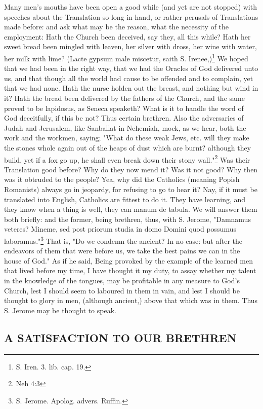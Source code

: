 Many men's mouths have been open a good while (and yet are not stopped) with speeches about the Translation so long in hand, or rather perusals of Translations made before: and ask what may be the reason, what the necessity of the employment: Hath the Church been deceived, say they, all this while? Hath her sweet bread been mingled with leaven, her silver with dross, her wine with water, her milk with lime? (Lacte gypsum male miscetur, saith S. Irenee,)\footnote{S. Iren. 3. lib. cap. 19.} We hoped that we had been in the right way, that we had the Oracles of God delivered unto us, and that though all the world had cause to be offended and to complain, yet that we had none. Hath the nurse holden out the breast, and nothing but wind in it? Hath the bread been delivered by the fathers of the Church, and the same proved to be lapidosus, as Seneca speaketh? What is it to handle the word of God deceitfully, if this be not? Thus certain brethren. Also the adversaries of Judah and Jerusalem, like Sanballat in Nehemiah, mock, as we hear, both the work and the workmen, saying; "What do these weak Jews, etc. will they make the stones whole again out of the heaps of dust which are burnt? although they build, yet if a fox go up, he shall even break down their stony wall."\footnote{Neh 4:3} Was their Translation good before? Why do they now mend it? Was it not good? Why then was it obtruded to the people? Yea, why did the Catholics (meaning Popish Romanists) always go in jeopardy, for refusing to go to hear it? Nay, if it must be translated into English, Catholics are fittest to do it. They have learning, and they know when a thing is well, they can manum de tabula. We will answer them both briefly: and the former, being brethren, thus, with S. Jerome, "Damnamus veteres? Mineme, sed post priorum studia in domo Domini quod possumus laboramus."\footnote{S. Jerome. Apolog. advers. Ruffin.} That is, "Do we condemn the ancient? In no case: but after the endeavors of them that were before us, we take the best pains we can in the house of God." As if he said, Being provoked by the example of the learned men that lived before my time, I have thought it my duty, to assay whether my talent in the knowledge of the tongues, may be profitable in any measure to God's Church, lest I should seem to laboured in them in vain, and lest I should be thought to glory in men, (although ancient,) above that which was in them. Thus S. Jerome may be thought to speak.

\subsection{A SATISFACTION TO OUR BRETHREN}

